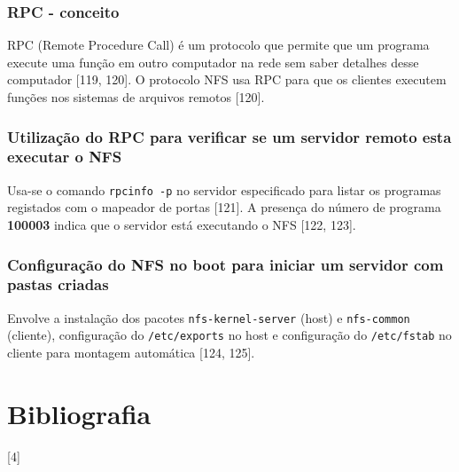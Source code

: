\documentclass[12pt, a4paper]{article}
\begin{document}
	\subsubsection{RPC - conceito} %
	RPC (Remote Procedure Call) é um protocolo que permite que um programa execute uma função em outro computador na rede sem saber detalhes desse computador [119, 120]. O protocolo NFS usa RPC para que os clientes executem funções nos sistemas de arquivos remotos [120].
	
	\subsubsection{Utilização do RPC para verificar se um servidor remoto esta executar o NFS} %
	Usa-se o comando \texttt{rpcinfo -p} no servidor especificado para listar os programas registados com o mapeador de portas [121]. A presença do número de programa \textbf{100003} indica que o servidor está executando o NFS [122, 123].
	
	\subsubsection{Configuração do NFS no boot para iniciar um servidor com pastas criadas} %
	Envolve a instalação dos pacotes \texttt{nfs-kernel-server} (host) e \texttt{nfs-common} (cliente), configuração do \texttt{/etc/exports} no host e configuração do \texttt{/etc/fstab} no cliente para montagem automática [124, 125].
	
	\newpage
	
	\section*{Bibliografia} [4]
	
\end{document}
